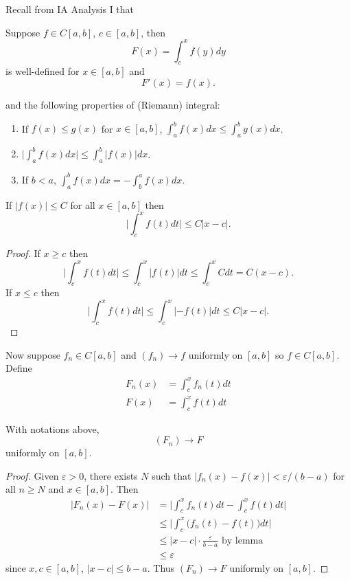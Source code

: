 \documentclass[a4paper]{article}
\theoremstyle{definition}
\begin{document}
Recall from IA Analysis I that
\begin{theorem}
  \label{thm:FTC}
  Suppose \(f\in C[a,b]\), \(c\in [a,b]\), then
  \[
    F(x) = \int_{c}^{x} f(y) dy
  \]
  is well-defined for \(x\in[a,b]\) and
  \[
    F'(x) = f(x).
  \]
\end{theorem}
and the following properties of (Riemann) integral:
\begin{enumerate}
\item If \(f(x) \leq g(x) \) for \(x\in[a,b]\), \(\int_{a}^{b} f(x) dx \leq \int_{a}^{b} g(x) dx \).
\item \(\big|\int_{a}^{b} f(x) dx \big| \leq \int_{a}^{b} |f(x)| dx \).
\item If \(b<a\), \(\int_{a}^{b} f(x) dx = - \int_{b}^{a} f(x) dx \).
\end{enumerate}

\begin{lemma}
  If \(|f(x)|\leq C\) for all \(x\in[a,b]\) then
  \[
    \Big| \int_{c}^{x} f(t) dt \Big| \leq C|x-c|.
  \]
\end{lemma}

\begin{proof}
  If \(x\geq c\) then
  \[
    \Big| \int_{c}^{x} f(t) dt \Big| \leq \int_{c}^{x} |f(t)| dt \leq \int_{c}^{x} C dt = C(x-c).
  \]
  If \(x\leq c\) then
   \[
    \Big| \int_{c}^{x} f(t) dt \Big| \leq \int_{c}^{x} |-f(t)| dt \leq C|x-c|.
  \]
\end{proof}

Now suppose \(f_n\in C[a,b]\) and \((f_n)\to f\) uniformly on \([a,b]\) so \(f\in C[a,b]\). Define
\begin{align*}
  F_n(x) &= \int_{c}^{x} f_n(t) dt \\
  F(x) &= \int_{c}^{x} f(t) dt
\end{align*}

\begin{proposition}
  \label{prop:power series integral convergence}
  With notations above,
  \[
    (F_n) \to F
  \]
  uniformly on \([a,b]\).
\end{proposition}

\begin{proof}
  Given \(\varepsilon>0\), there exists \(N\) such that \(|f_n(x) - f(x)| < \varepsilon/(b-a)\) for all \(n\geq N\) and \(x\in[a,b]\). Then
  \begin{align*}
    |F_n(x) - F(x)| &= \Big| \int_{c}^{x} f_n(t) dt - \int_{c}^{x} f(t) dt \Big| \\
                    &\leq \Big| \int_{c}^{x} \big( f_n(t) - f(t) \big) dt \Big| \\
                    &\leq |x-c| \cdot\frac{\varepsilon}{b-a} \text{ by lemma} \\
                    &\leq \varepsilon
  \end{align*}
  since \(x,c\in[a,b]\), \(|x-c|\leq b-a\). Thus \((F_n)\to F\) uniformly on \([a,b]\).
\end{proof}
\end{document}
